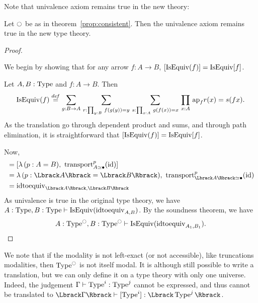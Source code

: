 Note that univalence axiom remains true in the new theory:
\begin{prop}\label{prop:univalence_modal}
  Let $\ocircle$ be as in theorem~\ref{prop:consistent}. Then the
  univalence axiom remains true in the new type theory.
\end{prop}
\begin{proof}

  \begin{lem}
    We begin by showing that for any arrow $f:A \to B$, $[\operatorname{IsEquiv}(f)]
    = \operatorname{IsEquiv}[f]$.
  \end{lem}
  \begin{prooflem}
    Let $A,B:\operatorname{Type}$ and $f:A\to B$. Then 
    \[\operatorname{IsEquiv}(f) \overset{de\hspace{-0.2ex}f}{=} \sum_{g:B\to A}\, \sum_{r:\prod_{y:B}\, f(g(y)) = y}\, \sum_{s:\prod_{x:A}\, g(f(x)) = x}\, \prod_{x:A}\, \mathrm{ap}_{f} r(x) = s(f x).
    \]
    As the translation go through dependent product and sums, and
    through path elimination, it is straightforward that 
    $[\operatorname{IsEquiv}(f)] = \operatorname{IsEquiv} [f]$.
  \end{prooflem}

  Now, 
  \begin{align*}
    [\mathrm{idtoequiv}_{A,B}] 
    &= [\lambda\, (p:A=B),~\transport_{A\simeq \bullet}^p (\id)]  \\
    &= \lambda\, (p:\Lbrack A \Rbrack =\Lbrack B\Rbrack ),~\transport_{\Lbrack
      A\Rbrack \simeq \bullet}^p (\id) \\
    &= \mathrm{idtoequiv}_{\Lbrack A \Rbrack,\Lbrack B \Rbrack}
  \end{align*}
  As univalence is true in the original type theory, we have 
  $A:\operatorname{Type},B:\operatorname{Type} \vdash \operatorname{IsEquiv}(\mathrm{idtoequiv}_{A,B})$. By the
  soundness theorem, we have
  \[A : \operatorname{Type}^{\ocircle},B:\operatorname{Type}^{\ocircle} \vdash
    \operatorname{IsEquiv}(\mathrm{\mathrm{idtoequiv}}_{A_1,B_1}). \]
 

\end{proof}

\begin{rmq}
  We note that if the modality is not left-exact (or not accessible),
  like truncations
  modalities, then $\operatorname{Type}^{\ocircle}$ is not itself modal. It is although
  still possible to write a translation, but we can only define it on
  a type theory with only one universe. Indeed, the judgement $\Gamma
  \vdash \operatorname{Type}^i : \operatorname{Type}^j$ cannot be expressed, and thus cannot be
  translated to $\Lbrack \Gamma \Rbrack \vdash [\Type^i] :
  \Lbrack \Type^j \Rbrack$. 
\end{rmq}

